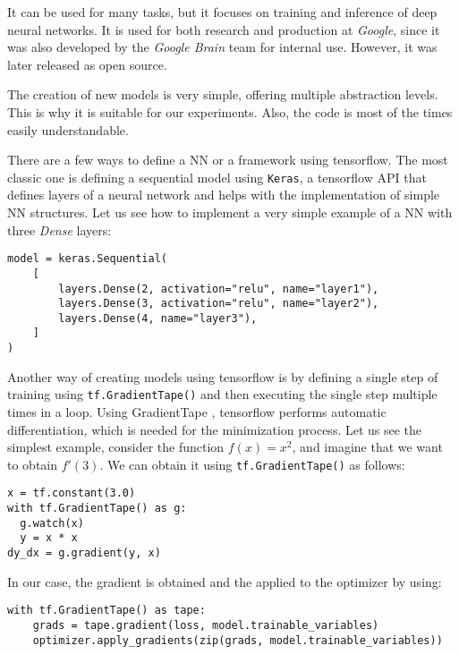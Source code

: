 


It can be used for many tasks, but it focuses on training and inference of deep neural networks. It is used for both research and production at \emph{Google}, since it was also developed by the \emph{Google Brain} team for internal use. However, it was later released as open source.

The creation of new models is very simple, offering multiple abstraction levels. This is why it is suitable for our experiments. Also, the code is most of the times easily understandable.

There are a few ways to define a NN or a framework using tensorflow. The most classic one is defining a sequential model using \lstinline{Keras}, a tensorflow API that defines layers of a neural network and helps with the implementation of simple NN structures. Let us see how to implement a very simple example of a NN with three \emph{Dense} layers: 

\begin{verbatim}
model = keras.Sequential(
    [
        layers.Dense(2, activation="relu", name="layer1"),
        layers.Dense(3, activation="relu", name="layer2"),
        layers.Dense(4, name="layer3"),
    ]
)
\end{verbatim}

Another way of creating models using tensorflow is by defining a single step of training using \lstinline{tf.GradientTape()} and then executing the single step multiple times in a loop. Using GradientTape , tensorflow performs automatic differentiation, which is needed for the minimization process. Let us see the simplest example, consider the function $f(x) = x^2$, and imagine that we want to obtain $f'(3)$. We can obtain it using \lstinline{tf.GradientTape()} as follows:

\begin{verbatim}
x = tf.constant(3.0)
with tf.GradientTape() as g:
  g.watch(x)
  y = x * x
dy_dx = g.gradient(y, x)
\end{verbatim}

In our case, the gradient is obtained and the applied to the optimizer by using:

\begin{verbatim}
with tf.GradientTape() as tape:
    grads = tape.gradient(loss, model.trainable_variables)
    optimizer.apply_gradients(zip(grads, model.trainable_variables))
\end{verbatim}


